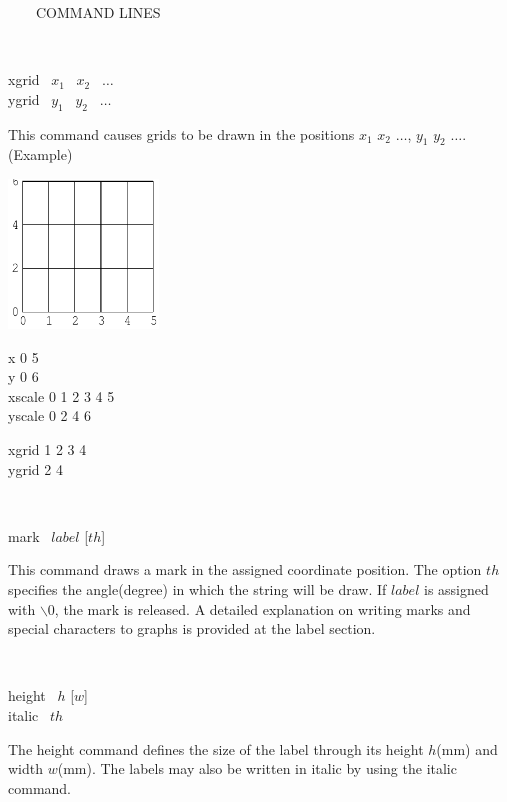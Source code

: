 \begin{qsection}{\ ~~~COMMAND LINES}
\begin{minipage}[t]{9cm}
\end{minipage}\\

\begin{minipage}[t]{5.5cm}
xgrid ~$x_1$ ~$x_2$ ~$\dots$\\
ygrid ~$y_1$ ~$y_2$ ~$\dots$
\end{minipage}
\begin{minipage}[t]{9cm}
This command causes grids to be drawn in the positions $x_1$ $x_2$ $\dots$,
$y_1$ $y_2$ $\dots$.\\
(Example)\\
\begin{minipage}[t]{4.3cm}
 \includegraphics[width=4cm]{fig/grid.pdf}
\end{minipage}
\begin{minipage}[b]{4.5cm}
\baselineskip 5pt
x 0 5\\
y 0 6\\
xscale 0 1 2 3 4 5\\
yscale 0 2 4 6

\vspace{3mm}
xgrid 1 2 3 4\\
ygrid 2 4
\vspace*{1cm}
\end{minipage}
\end{minipage}\\


\begin{minipage}[t]{5.5cm}
mark ~$label$ [$th$]
\end{minipage}
\begin{minipage}[t]{9cm}
This command draws a mark in the assigned coordinate position.
The option $th$ specifies the angle(degree) in which the string will be draw.
If $label$ is assigned with $\backslash 0$, the mark is released.
A detailed explanation on writing marks and special characters to graphs is
 provided at the label section.
\end{minipage}\\

\begin{minipage}[t]{5.5cm}
height ~$h$ [$w$]\\
italic ~$th$
\end{minipage}
\begin{minipage}[t]{9cm}
The height command defines the size of the label through its
height $h$(mm) and width $w$(mm).
The labels may also be written in italic by using the italic command.
\end{minipage}\\


\end{qsection}
